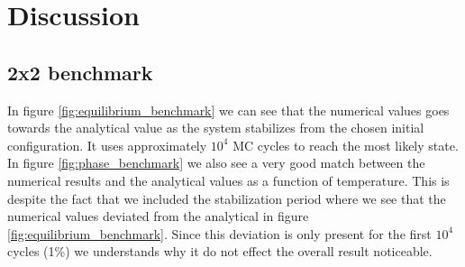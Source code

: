\documentclass[%
 reprint,
nofootinbib,
aps,
]{revtex4-1}
\begin{document}
\section{Discussion}
\subsection{2x2 benchmark}
In figure \ref{fig:equilibrium_benchmark} we can see that the numerical values goes towards the analytical value as the system stabilizes from the chosen initial configuration. It uses approximately $10^4$ MC cycles to reach the most likely state. In figure \ref{fig:phase_benchmark} we also see a very good match between the numerical results and the analytical values as a function of temperature. This is despite the fact that we included the stabilization period where we see that the numerical values deviated from the analytical in figure \ref{fig:equilibrium_benchmark}. Since this deviation is only present for the first $10^4$ cycles (1\%) we understands why it do not effect the overall result noticeable.


\newpage
\end{document}
